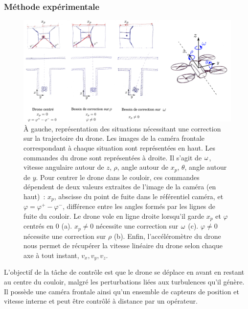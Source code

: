 \documentclass[../main]{subfiles}
\begin{document}
\subsubsection{Méthode expérimentale}

\begin{figure}
	\centering\includegraphics[width=\textwidth]{vp_drone.pdf}
	\caption{\`A gauche, représentation des situations nécessitant une correction sur la trajectoire du drone. Les images de la caméra frontale correspondant à chaque situation sont représentées en haut.
	Les commandes du drone sont représentées à droite. Il s'agit de $\omega$, vitesse angulaire autour de $z$, $\rho$, angle autour de $x_p$, $\theta$, angle autour de $y$. 
	Pour centrer le drone dans le couloir, ces commandes dépendent de deux valeurs extraites de l'image de la caméra (en haut)~: $x_p$, abscisse du point de fuite dans le référentiel caméra, et $\varphi = \varphi^+ - \varphi^-$, différence entre les angles formés par les lignes de fuite du couloir.
	Le drone vole en ligne droite lorsqu'il garde $x_p$ et $\varphi$ centrés en 0 (a).
	$x_p \neq 0$ nécessite une correction sur $\omega$ (c). 
	$\varphi \neq 0$ nécessite une correction sur $\rho$ (b).
	Enfin, l'accéléromètre du drone nous permet de récupérer la vitesse linéaire du drone selon chaque axe à tout instant, $v_x,v_y,v_z$.
	}
	\label{fig:drone}
	\end{figure}

L'objectif de la tâche de contrôle est que le drone se déplace en avant en restant au centre du couloir, malgré les perturbations liées aux turbulences qu'il génère. Il possède une caméra frontale ainsi qu'un ensemble de capteurs de position et vitesse interne et peut être contrôlé à distance par un opérateur. 
\end{document}
